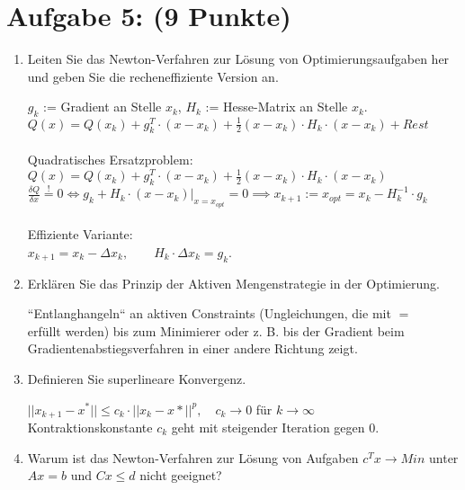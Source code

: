 \documentclass[12pt]{article}
\begin{document}
\section*{Aufgabe 5: (9 Punkte)}
\begin{enumerate}

	\item Leiten Sie das Newton-Verfahren zur Lösung von Optimierungsaufgaben her und geben Sie die recheneffiziente Version an.
	\begin{solution}
		$g_k$ := Gradient an Stelle $x_k$, $H_k$ := Hesse-Matrix an Stelle $x_k$.\\
		$Q(x) = Q(x_k) + g_k^T\cdot (x-x_k) + \frac{1}{2} (x-x_k)\cdot H_k \cdot (x-x_k) + Rest$\\\\
		Quadratisches Ersatzproblem:\\
		$Q(x) = Q(x_k) + g_k^T\cdot (x-x_k) + \frac{1}{2} (x-x_k)\cdot H_k \cdot (x-x_k)$\\
		$\frac{\delta Q}{\delta x} \stackrel{!}{=} 0 \iff g_k + H_k\cdot (x-x_k)|_{x=x_{opt}} = 0 \implies x_{k+1} := x_{opt} = x_k - H_k^{-1}\cdot g_k$\\\\
		Effiziente Variante:\\
		$x_{k+1} = x_k - \Delta x_k, \qquad H_k\cdot \Delta x_k = g_k$.
	\end{solution}
	
	
	\item Erklären Sie das Prinzip der Aktiven Mengenstrategie in der Optimierung.
	\begin{solution}
		``Entlanghangeln`` an aktiven Constraints (Ungleichungen, die mit $=$\\ erfüllt werden) bis zum Minimierer oder z. B. bis der Gradient beim\\ Gradientenabstiegsverfahren in einer andere Richtung zeigt.
	\end{solution}
	
	\item Definieren Sie superlineare Konvergenz.
	\begin{solution}
		$||x_{k+1} - x^{*}|| \leq c_k \cdot ||x_k - x*||^p, \quad c_k \rightarrow 0$ für $k \rightarrow \infty$\\
		Kontraktionskonstante $c_k$ geht mit steigender Iteration gegen 0.
	\end{solution}
	
	\item Warum ist das Newton-Verfahren zur Lösung von Aufgaben $c^T x \rightarrow Min$ unter $Ax = b$ und $Cx \leq d$ nicht geeignet?
	

\end{enumerate}
\end{document}
